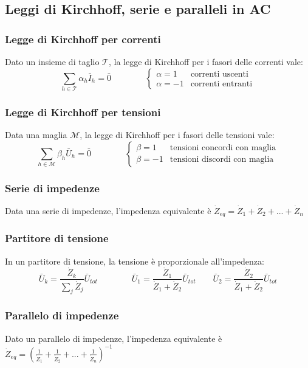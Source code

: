 \documentclass[a4paper]{article}
\begin{document}
\newpage

\subsection{Leggi di Kirchhoff, serie e paralleli in AC}
\subsubsection*{Legge di Kirchhoff per correnti}
Dato un insieme di taglio \(\mathcal{T}\), la legge di Kirchhoff per i fasori delle correnti  vale:
\[\sum_{h \in \mathcal{T}} \alpha_h \bar{I}_h = \bar{0} \qquad \qquad \begin{cases}\alpha = 1 &\text{correnti uscenti} \\ \alpha = -1 &\text{correnti entranti}\end{cases}\]

\subsubsection*{Legge di Kirchhoff per tensioni}
Data una maglia \(\mathcal{M}\), la legge di Kirchhoff per i fasori delle tensioni vale:
\[\sum_{h \in \mathcal{M}} \beta_h \bar{U}_h = \bar{0} \qquad \qquad \begin{cases}\beta = 1 &\text{tensioni concordi con maglia} \\ \beta = -1 &\text{tensioni discordi con maglia}\end{cases}\]

\subsubsection*{Serie di impedenze}
Data una serie di impedenze, l'impedenza equivalente è \(\dot{Z}_{eq} = \dot{Z}_1 + \dot{Z}_2 + ... + \dot{Z}_n\)

\subsubsection*{Partitore di tensione}
In un partitore di tensione, la tensione è proporzionale all'impedenza:
\[\bar{U}_k = \frac{\dot{Z}_k}{\sum_j \dot{Z}_j} \bar{U}_{tot} \qquad\qquad \bar{U}_1 = \frac{\dot{Z}_1}{\dot{Z}_1 + \dot{Z}_2} \bar{U}_{tot} \qquad \bar{U}_2 = \frac{\dot{Z}_2}{\dot{Z}_1 + \dot{Z}_2} \bar{U}_{tot}\]

\subsubsection*{Parallelo di impedenze}
Dato un parallelo di impedenze, l'impedenza equivalente è \(\dot{Z}_{eq} = \left(\frac{1}{\dot{Z}_1} + \frac{1}{\dot{Z}_2} + ... + \frac{1}{\dot{Z}_n}\right)^{-1}\)
\end{document}
